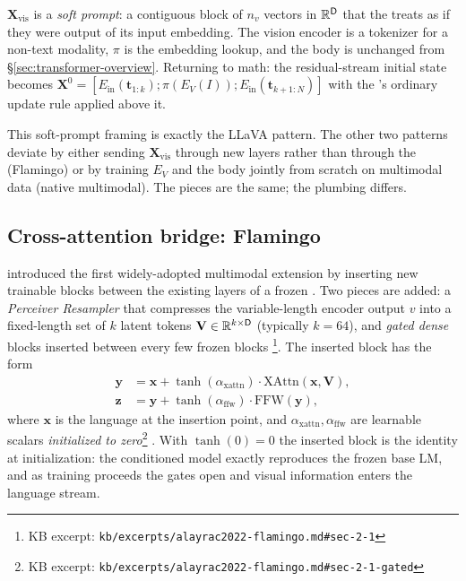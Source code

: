 \begin{intuition}
$\mathbf{X}_{\text{vis}}$ is a \emph{soft prompt}: a contiguous block of
$n_v$ vectors in $\mathbb{R}^{\mathsf{D}}$ that the  treats as if they were
output of its input embedding. The vision encoder is a tokenizer for a
non-text modality, $\pi$ is the embedding lookup, and the  body is
unchanged from \S\ref{sec:transformer-overview}. Returning to math:
the residual-stream initial state becomes $\mathbf{X}^0 =
[E_{\text{in}}(\mathbf{t}_{1:k}); \pi(E_V(I)); E_{\text{in}}(\mathbf{t}_{k+1:N})]$
with the 's ordinary update rule applied above it.
\end{intuition}

This soft-prompt framing is exactly the LLaVA pattern. The other two
patterns deviate by either sending $\mathbf{X}_{\text{vis}}$ through new
\emph{} layers rather than through the 
(Flamingo) or by training $E_V$ and the  body jointly from scratch on
multimodal data (native multimodal). The pieces are the same; the
plumbing differs.

\subsection{Cross-attention bridge: Flamingo}
\label{sec:multimodal-flamingo}

\citet{alayrac2022-flamingo} introduced the first widely-adopted
multimodal extension by inserting new trainable blocks between the
existing layers of a frozen . Two pieces are added: a
\emph{Perceiver Resampler} that compresses the variable-length encoder
output $v$ into a fixed-length set of $k$ latent tokens
$\mathbf{V} \in \mathbb{R}^{k \times \mathsf{D}}$ (typically $k{=}64$),
and \emph{gated  dense} blocks
inserted between every few frozen  blocks%
\footnote{KB excerpt: \texttt{kb/excerpts/alayrac2022-flamingo.md\#sec-2-1}}.
The inserted block has the form
\begin{align}
\mathbf{y} &= \mathbf{x} + \tanh(\alpha_{\text{xattn}}) \cdot \mathrm{XAttn}(\mathbf{x},\mathbf{V}), \label{eq:flamingo-xattn}\\
\mathbf{z} &= \mathbf{y} + \tanh(\alpha_{\text{ffw}}) \cdot \mathrm{FFW}(\mathbf{y}),  \label{eq:flamingo-ffw}
\end{align}
where $\mathbf{x}$ is the language  at the insertion point,
and $\alpha_{\text{xattn}}, \alpha_{\text{ffw}}$ are learnable scalars
\emph{initialized to zero}\footnote{KB excerpt:
\texttt{kb/excerpts/alayrac2022-flamingo.md\#sec-2-1-gated}}
\citep{alayrac2022-flamingo}. With $\tanh(0){=}0$ the inserted block
is the identity at initialization: the conditioned model exactly
reproduces the frozen base LM, and as training proceeds the gates open
and visual information enters the language stream.

